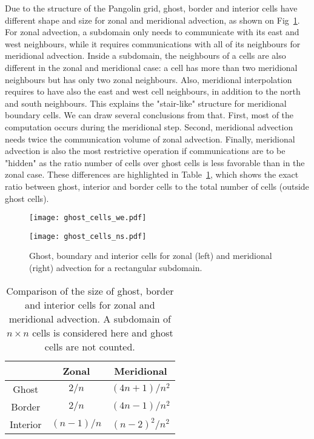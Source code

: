 Due to the structure of the Pangolin grid, ghost, border
and interior cells have different shape and size for zonal and meridional advection, as shown on
Fig~\ref{fig:ghost_cells}. For zonal advection, a subdomain only needs to
communicate with its east and west neighbours, while it requires communications
with all of its neighbours for meridional advection. Inside a subdomain, the
neighbours of a cells are also different in the zonal and meridional case: a
cell has more than two meridional neighbours but has only two zonal neighbours.
Also, meridional interpolation requires to have also the east and west cell
neighbours, in addition to the north and south neighbours. This explains the
"stair-like" structure for meridional boundary cells. We can draw several
conclusions from that. First, most of the computation occurs during the meridional step. Second, meridional
advection needs twice the communication volume of zonal advection. Finally,
meridional advection is also the most restrictive operation if communications
are to be "hidden" as the ratio number of cells over ghost cells is less
favorable than in the zonal case. These differences are highlighted in
Table~\ref{tab:size_interior}, which shows the exact ratio between ghost, interior and
border cells to the total number of cells (outside ghost cells).

\begin{figure}
  \begin{minipage}{0.49\linewidth}
    \texttt{[image: ghost\_cells\_we.pdf]}
  \end{minipage}
  \begin{minipage}{0.49\linewidth}
    \texttt{[image: ghost\_cells\_ns.pdf]}
  \end{minipage}
  \caption{%
    Ghost, boundary and interior cells for zonal (left) and meridional
  (right) advection for a rectangular subdomain.}
  \label{fig:ghost_cells}
\end{figure}

\begin{table}
 \centering
 \begin{tabular}{ccc}
    \toprule
    & Zonal & Meridional \\
     \midrule
     Ghost & $2/n$ & $(4n+1)/n^2$\\
     Border & $2/n$ & $(4n-1)/n^2$ \\
     Interior & $(n-1)/n$ & $(n-2)^2/n^2$ \\
    \bottomrule
  \end{tabular}
  \caption{Comparison of the size of ghost, border and interior cells for zonal
  and meridional advection. A subdomain of $n\times n$ cells is considered here and
  ghost cells are not counted.}
  \label{tab:size_interior}
\end{table}

